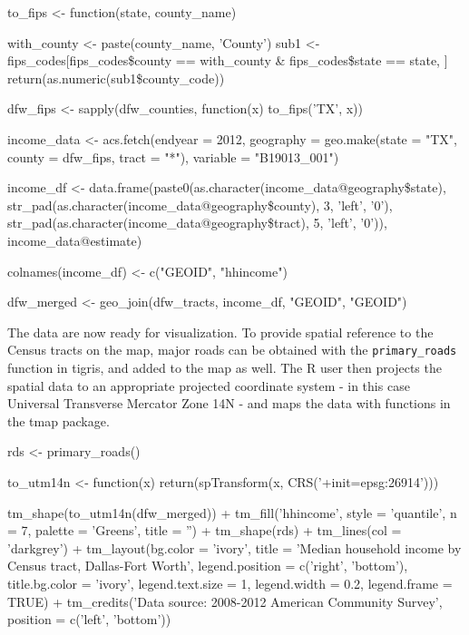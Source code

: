 \begin{Schunk}
\begin{Sinput}
to_fips <- function(state, county_name) {
  with_county <- paste(county_name, 'County')
  sub1 <- fips_codes[fips_codes\$county == with_county & fips_codes\$state == state, ]
  return(as.numeric(sub1\$county_code))
    
}

dfw_fips <- sapply(dfw_counties, function(x) to_fips('TX', x))

income_data <- acs.fetch(endyear = 2012, 
                         geography = geo.make(state = "TX", 
                                              county = dfw_fips, 
                                              tract = "*"), 
                         variable = "B19013_001")

income_df <- data.frame(paste0(as.character(income_data@geography\$state), 
                               str_pad(as.character(income_data@geography\$county), 3, 'left', '0'), 
                               str_pad(as.character(income_data@geography\$tract), 5, 'left', '0')), 
                        income_data@estimate)

colnames(income_df) <- c("GEOID", "hhincome")

dfw_merged <- geo_join(dfw_tracts, income_df, "GEOID", "GEOID")
\end{Sinput}
\end{Schunk}

The data are now ready for visualization. To provide spatial reference
to the Census tracts on the map, major roads can be obtained with the
\texttt{primary\_roads} function in tigris, and added to the map as
well. The R user then projects the spatial data to an appropriate
projected coordinate system - in this case Universal Transverse Mercator
Zone 14N - and maps the data with functions in the tmap package.

\begin{Schunk}
\begin{Sinput}
rds <- primary_roads()

to_utm14n <- function(x) {
  return(spTransform(x, CRS('+init=epsg:26914')))
} 

tm_shape(to_utm14n(dfw_merged)) + 
  tm_fill('hhincome', style = 'quantile', n = 7, palette = 'Greens', title = '') + 
tm_shape(rds) + 
  tm_lines(col = 'darkgrey') + 
tm_layout(bg.color = 'ivory', title = 'Median household income by Census tract, Dallas-Fort Worth', 
          legend.position = c('right', 'bottom'), title.bg.color = 'ivory', legend.text.size = 1, 
          legend.width = 0.2, legend.frame = TRUE) + 
tm_credits('Data source: 2008-2012 American Community Survey', 
           position = c('left', 'bottom'))
\end{Sinput}
\end{Schunk}

